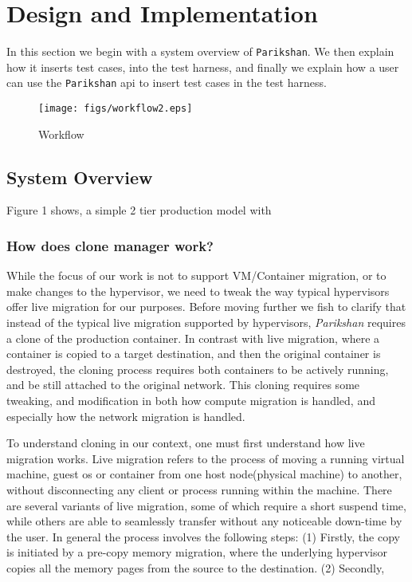 
\section{Design and Implementation}

In this section we begin with a system overview of \texttt{Parikshan}. 
We then explain how it inserts test cases, into the test harness, and finally we explain how a user can use the \texttt{Parikshan} api to insert test cases in the test harness.

\begin{figure*}[t]
  \begin{center}
    \texttt{[image: figs/workflow2.eps]}
    \caption{Workflow}
    \label{fig:Backend wrapped around with Parakishan Run-time}
  \end{center}
\end{figure*}


\subsection{System Overview}

Figure 1 shows, a simple 2 tier production model with 


\subsubsection{How does clone manager work?}

While the focus of our work is not to support VM/Container migration, or to make changes to the hypervisor, we need to tweak the way typical hypervisors offer live migration for our purposes.
Before moving further we fish to clarify that instead of the typical live migration supported by hypervisors, \textit{Parikshan} requires a clone of the production container. 
In contrast with live migration, where a container is copied to a target destination, and then the original container is destroyed, the cloning process requires both containers to be actively running, and be still attached to the original network.
This cloning requires some tweaking, and modification in both how compute migration is handled, and especially how the network migration is handled. 

To understand cloning in our context, one must first understand how live migration works. 
Live migration refers to the process of moving a running virtual machine, guest os or container from one host node(physical machine) to another, without disconnecting any client or process running within the machine. 
There are several variants of live migration, some of which require a short suspend time, while others are able to seamlessly transfer without any noticeable down-time by the user.
In general the process involves the following steps: (1) Firstly, the copy is initiated by a pre-copy memory migration, where the underlying hypervisor copies all the memory pages from the source to the destination. (2) Secondly, 
